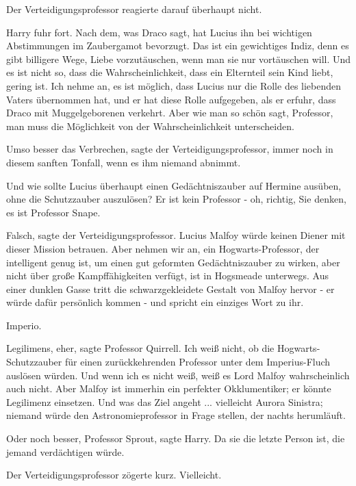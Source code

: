 Der Verteidigungsprofessor reagierte darauf überhaupt nicht.

Harry fuhr fort. \glqq Nach dem, was Draco sagt, hat Lucius ihn bei wichtigen
Abstimmungen im Zaubergamot bevorzugt. Das ist ein gewichtiges Indiz, denn es
gibt billigere Wege, Liebe vorzutäuschen, wenn man sie nur vortäuschen will. Und
es ist nicht so, dass die Wahrscheinlichkeit, dass ein Elternteil sein Kind
liebt, gering ist. Ich nehme an, es ist möglich, dass Lucius nur die Rolle des
liebenden Vaters übernommen hat, und er hat diese Rolle aufgegeben, als er
erfuhr, dass Draco mit Muggelgeborenen verkehrt. Aber wie man so schön sagt,
Professor, man muss die Möglichkeit von der Wahrscheinlichkeit
unterscheiden.\grqq{}

\glqq Umso besser das Verbrechen\grqq{}, sagte der Verteidigungsprofessor, immer
noch in diesem sanften Tonfall, \glqq wenn es ihm niemand abnimmt.\grqq{}

\glqq Und wie sollte Lucius überhaupt einen Gedächtniszauber auf Hermine
ausüben, ohne die Schutzzauber auszulösen? Er ist kein Professor - oh, richtig,
Sie denken, es ist Professor Snape.\grqq{}

\glqq Falsch\grqq{}, sagte der Verteidigungsprofessor. \glqq Lucius Malfoy würde
keinen Diener mit dieser Mission betrauen. Aber nehmen wir an, ein
Hogwarts-Professor, der intelligent genug ist, um einen gut geformten
Gedächtniszauber zu wirken, aber nicht über große Kampffähigkeiten verfügt, ist
in Hogsmeade unterwegs. Aus einer dunklen Gasse tritt die schwarzgekleidete
Gestalt von Malfoy hervor - er würde dafür persönlich kommen - und spricht ein
einziges Wort zu ihr.\grqq{}

\glqq Imperio.\grqq{}

\glqq Legilimens, eher\grqq{}, sagte Professor Quirrell. \glqq Ich weiß nicht,
ob die Hogwarts-Schutzzauber für einen zurückkehrenden Professor unter dem
Imperius-Fluch auslösen würden. Und wenn ich es nicht weiß, weiß es Lord Malfoy
wahrscheinlich auch nicht. Aber Malfoy ist immerhin ein perfekter Okklumentiker;
er könnte Legilimenz einsetzen. Und was das Ziel angeht ... vielleicht Aurora
Sinistra; niemand würde den Astronomieprofessor in Frage stellen, der nachts
herumläuft.\grqq{}

\glqq Oder noch besser, Professor Sprout\grqq{}, sagte Harry. \glqq Da sie die
letzte Person ist, die jemand verdächtigen würde.\grqq{}

Der Verteidigungsprofessor zögerte kurz. \glqq Vielleicht.\grqq{}

